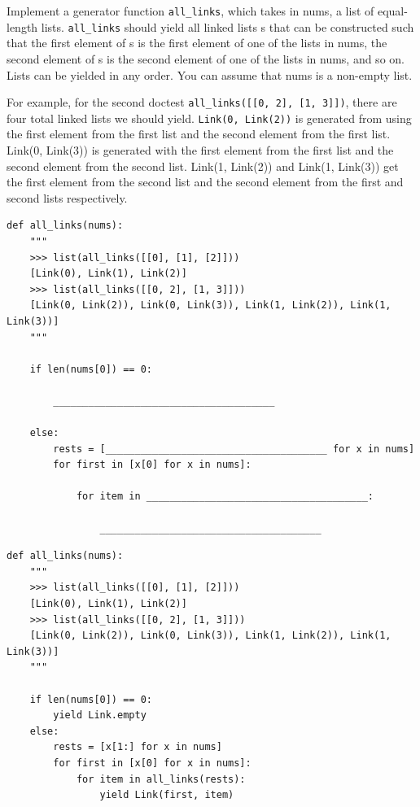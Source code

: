 \documentclass{exam}
\newlength{\currentparskip}
\newenvironment{blocksection}
{
    \setlength{\currentparskip}{\parskip}%
    \begin{minipage}{\linewidth}
    \setlength{\parskip}{\currentparskip}%
}
{
    \end{minipage}
}
\begin{document}
\begin{questions}
\begin{blocksection}
    Implement a generator function \lstinline{all_links}, which takes in nums, a list of equal-length lists. \lstinline{all_links} should yield all linked lists s that can be constructed such that the first element of s is the first element of one of the lists in nums, the second element of s is the second element of one of the lists in nums, and so on. Lists can be yielded in any order. You can assume that nums is a non-empty list.
    
    For example, for the second doctest \lstinline{all_links([[0, 2], [1, 3]])}, there are four total linked lists we should yield. \lstinline{Link(0, Link(2))} is generated from using the first element from the first list and the second element from the first list. Link(0, Link(3)) is generated with the first element from the first list and the second element from the second list. Link(1, Link(2)) and Link(1, Link(3)) get the first element from the second list and the second element from the first and second lists respectively.
\begin{lstlisting}
def all_links(nums):
    """
    >>> list(all_links([[0], [1], [2]]))
    [Link(0), Link(1), Link(2)]
    >>> list(all_links([[0, 2], [1, 3]]))
    [Link(0, Link(2)), Link(0, Link(3)), Link(1, Link(2)), Link(1, Link(3))]
    """
    
    if len(nums[0]) == 0:

        ______________________________________

    else:
        rests = [______________________________________ for x in nums]
        for first in [x[0] for x in nums]:

            for item in ______________________________________:

                ______________________________________
\end{lstlisting}
\end{blocksection}
\begin{solution}
\begin{lstlisting}
def all_links(nums):
    """
    >>> list(all_links([[0], [1], [2]]))
    [Link(0), Link(1), Link(2)]
    >>> list(all_links([[0, 2], [1, 3]]))
    [Link(0, Link(2)), Link(0, Link(3)), Link(1, Link(2)), Link(1, Link(3))]
    """
        
    if len(nums[0]) == 0:
        yield Link.empty
    else:
        rests = [x[1:] for x in nums]
        for first in [x[0] for x in nums]:
            for item in all_links(rests):
                yield Link(first, item)
\end{lstlisting}
\end{solution}
\end{questions}
\end{document}
